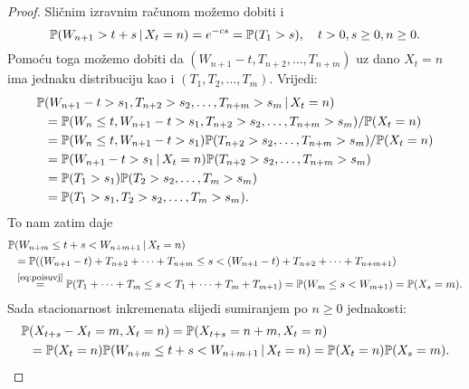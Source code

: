 \documentclass[main.tex]{subfiles}
\begin{document}
\begin{proof}
	Sličnim izravnim računom možemo dobiti i
	\begin{equation} \label{eq:poiswnuzxt}
		\mathbb{P}(W_{n+1} > t + s \, \vert \, X_t = n) = e^{-cs} = \mathbb{P}(T_1 > s), \quad t > 0, s \ge 0, n \ge 0.
	\end{equation}
	Pomoću toga možemo dobiti da \( (W_{n+1} - t, T_{n+2}, \ldots, T_{n+m}) \) uz dano \( X_t = n \)
	ima jednaku distribuciju kao i \( (T_1, T_2, \ldots, T_m) \). Vrijedi:
	\begin{align}
		\mathbb{P} & (W_{n+1} -t > s_1 , T_{n+2} > s_2, \ldots, T_{n+m} > s_m \, \vert \, X_t = n)         \\
		   & =\mathbb{P}(W_n \le t, W_{n+1} -t > s_1, T_{n+2} > s_2, \ldots, T_{n+m} > s_m)/\mathbb{P}(X_t=n) \\
		   & =\mathbb{P}(W_n \le t, W_{n+1} -t > s_1)\mathbb{P}(T_{n+2}>s_2,\ldots,T_{n+m}>s_m)/\mathbb{P}(X_t=n)     \\
		   & =\mathbb{P}(W_{n+1} -t>s_1 \, \vert \, X_t = n)\mathbb{P}(T_{n+2}>s_2,\ldots,T_{n+m}>s_m)             \\
		   & =\mathbb{P}(T_1>s_1)\mathbb{P}(T_2>s_2,\ldots,T_m>s_m)                                           \\
		   & =\mathbb{P}(T_1>s_1,T_2>s_2,\ldots,T_m>s_m). \label{eq:poisuvj}
	\end{align}
	To nam zatim daje
	\begin{equation}
		\begin{aligned} \label{eq:poislema}
			\mathbb{P} & (W_{n+m} \le t+s < W_{n+m+1} \, \vert \, X_t = n)                                                   \\
			   & =\mathbb{P}((W_{n+1}-t)+T_{n+2} + \cdots + T_{n+m} \le s < (W_{n+1}-t) + T_{n+2} + \cdots + T_{n+m+1}) \\
			   & \overset{\footnotesize\eqref{eq:poisuvj}}= \mathbb{P}(T_1+\cdots+T_m \le s < T_1+\cdots+T_m+T_{m+1})
			= \mathbb{P}(W_m \le s < W_{m+1}) = \mathbb{P}(X_s=m).
		\end{aligned}
	\end{equation}
	Sada stacionarnost inkremenata slijedi sumiranjem po \( n \ge 0 \) jednakosti:
	\begin{equation}
		\begin{aligned}
			\mathbb{P} & (X_{t+s}-X_t =  m, X_t=n) = \mathbb{P}(X_{t+s}=n+m, X_t=n)                              \\
			   & = \mathbb{P}(X_t=n)\mathbb{P}(W_{n+m} \le t+s < W_{n+m+1} \, \vert \, X_t = n) = \mathbb{P}(X_t=n)\mathbb{P}(X_s=m).
		\end{aligned}
	\end{equation}


\end{proof}
\end{document}

